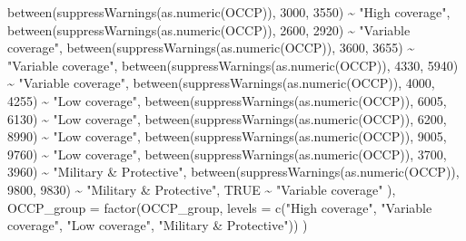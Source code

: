 \documentclass[
  letterpaper,
  DIV=11,
  numbers=noendperiod]{scrartcl}
\newenvironment{Shaded}{\begin{snugshade}}{\end{snugshade}}
\newcommand{\AttributeTok}[1]{\textcolor[rgb]{0.40,0.45,0.13}{#1}}
\newcommand{\ConstantTok}[1]{\textcolor[rgb]{0.56,0.35,0.01}{#1}}
\newcommand{\DecValTok}[1]{\textcolor[rgb]{0.68,0.00,0.00}{#1}}
\newcommand{\FunctionTok}[1]{\textcolor[rgb]{0.28,0.35,0.67}{#1}}
\newcommand{\NormalTok}[1]{\textcolor[rgb]{0.00,0.23,0.31}{#1}}
\newcommand{\SpecialCharTok}[1]{\textcolor[rgb]{0.37,0.37,0.37}{#1}}
\newcommand{\StringTok}[1]{\textcolor[rgb]{0.13,0.47,0.30}{#1}}
\begin{document}
\begin{Shaded}
\begin{Highlighting}[]
      \FunctionTok{between}\NormalTok{(}\FunctionTok{suppressWarnings}\NormalTok{(}\FunctionTok{as.numeric}\NormalTok{(OCCP)), }\DecValTok{3000}\NormalTok{, }\DecValTok{3550}\NormalTok{) }\SpecialCharTok{\textasciitilde{}} \StringTok{"High coverage"}\NormalTok{,}
      \FunctionTok{between}\NormalTok{(}\FunctionTok{suppressWarnings}\NormalTok{(}\FunctionTok{as.numeric}\NormalTok{(OCCP)), }\DecValTok{2600}\NormalTok{, }\DecValTok{2920}\NormalTok{) }\SpecialCharTok{\textasciitilde{}} \StringTok{"Variable coverage"}\NormalTok{,}
      \FunctionTok{between}\NormalTok{(}\FunctionTok{suppressWarnings}\NormalTok{(}\FunctionTok{as.numeric}\NormalTok{(OCCP)), }\DecValTok{3600}\NormalTok{, }\DecValTok{3655}\NormalTok{) }\SpecialCharTok{\textasciitilde{}} \StringTok{"Variable coverage"}\NormalTok{,}
      \FunctionTok{between}\NormalTok{(}\FunctionTok{suppressWarnings}\NormalTok{(}\FunctionTok{as.numeric}\NormalTok{(OCCP)), }\DecValTok{4330}\NormalTok{, }\DecValTok{5940}\NormalTok{) }\SpecialCharTok{\textasciitilde{}} \StringTok{"Variable coverage"}\NormalTok{,}
      \FunctionTok{between}\NormalTok{(}\FunctionTok{suppressWarnings}\NormalTok{(}\FunctionTok{as.numeric}\NormalTok{(OCCP)), }\DecValTok{4000}\NormalTok{, }\DecValTok{4255}\NormalTok{) }\SpecialCharTok{\textasciitilde{}} \StringTok{"Low coverage"}\NormalTok{,}
      \FunctionTok{between}\NormalTok{(}\FunctionTok{suppressWarnings}\NormalTok{(}\FunctionTok{as.numeric}\NormalTok{(OCCP)), }\DecValTok{6005}\NormalTok{, }\DecValTok{6130}\NormalTok{) }\SpecialCharTok{\textasciitilde{}} \StringTok{"Low coverage"}\NormalTok{,}
      \FunctionTok{between}\NormalTok{(}\FunctionTok{suppressWarnings}\NormalTok{(}\FunctionTok{as.numeric}\NormalTok{(OCCP)), }\DecValTok{6200}\NormalTok{, }\DecValTok{8990}\NormalTok{) }\SpecialCharTok{\textasciitilde{}} \StringTok{"Low coverage"}\NormalTok{,}
      \FunctionTok{between}\NormalTok{(}\FunctionTok{suppressWarnings}\NormalTok{(}\FunctionTok{as.numeric}\NormalTok{(OCCP)), }\DecValTok{9005}\NormalTok{, }\DecValTok{9760}\NormalTok{) }\SpecialCharTok{\textasciitilde{}} \StringTok{"Low coverage"}\NormalTok{,}
      \FunctionTok{between}\NormalTok{(}\FunctionTok{suppressWarnings}\NormalTok{(}\FunctionTok{as.numeric}\NormalTok{(OCCP)), }\DecValTok{3700}\NormalTok{, }\DecValTok{3960}\NormalTok{) }\SpecialCharTok{\textasciitilde{}} \StringTok{"Military \& Protective"}\NormalTok{,}
      \FunctionTok{between}\NormalTok{(}\FunctionTok{suppressWarnings}\NormalTok{(}\FunctionTok{as.numeric}\NormalTok{(OCCP)), }\DecValTok{9800}\NormalTok{, }\DecValTok{9830}\NormalTok{) }\SpecialCharTok{\textasciitilde{}} \StringTok{"Military \& Protective"}\NormalTok{,}
      \ConstantTok{TRUE}                                                     \SpecialCharTok{\textasciitilde{}} \StringTok{"Variable coverage"}
\NormalTok{    ),}
    \AttributeTok{OCCP\_group =} \FunctionTok{factor}\NormalTok{(OCCP\_group,}
                        \AttributeTok{levels =} \FunctionTok{c}\NormalTok{(}\StringTok{"High coverage"}\NormalTok{, }\StringTok{"Variable coverage"}\NormalTok{,}
                                   \StringTok{"Low coverage"}\NormalTok{, }\StringTok{"Military \& Protective"}\NormalTok{))}
\NormalTok{  )}


\end{Highlighting}
\end{Shaded}
\end{document}
